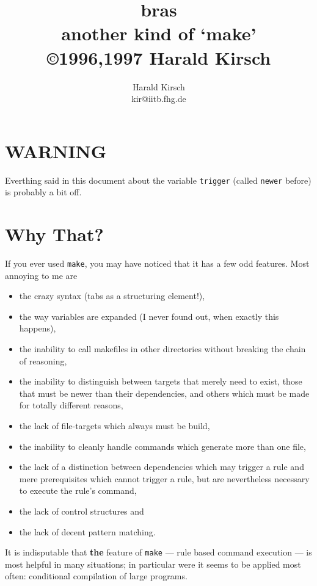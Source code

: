 \documentclass[12pt]{article}
\title{\textsf{bras}\\
another kind of `make'\\
\small \copyright 1996,1997 Harald Kirsch}
\author{\relax
Harald Kirsch\\
kir@iitb.fhg.de}
\begin{document}
\maketitle
\tableofcontents

\section*{WARNING}
Everthing said in this document about the variable \texttt{trigger}
(called \texttt{newer} before) is probably a bit off.


\section{Why That?}
If you ever used \texttt{make}, you may have noticed that it has a few
odd features. Most annoying to me are
\begin{itemize}
\item the crazy syntax (tabs as a structuring element!),
\item the way variables are expanded (I never found out, when exactly
this happens),
\item the inability to call makefiles in other directories without
breaking the chain of reasoning,
\item the inability to distinguish between targets that merely need to
  exist, those that must be newer than their dependencies, and others
  which must be made for totally different reasons,
\item the lack of file-targets which always must be build,
\item the inability to cleanly handle commands which generate more
than one file,
\item the lack of a distinction between dependencies which may trigger
a rule and mere prerequisites which cannot trigger a rule, but are
nevertheless necessary to execute the rule's command,
\item the lack of control structures and 
\item the lack of decent pattern matching.
\end{itemize}

It is indisputable that \textbf{the} feature of \texttt{make} ---
rule based command execution --- is most helpful in many situations;
in particular were it seems to be applied most often:
conditional compilation of large programs.
\end{document}
